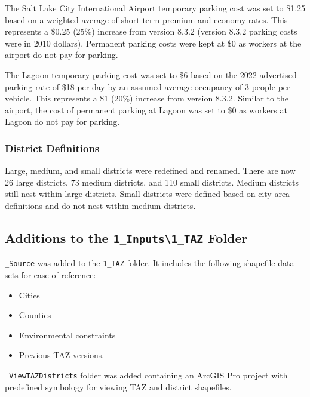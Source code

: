 \documentclass[
  letterpaper,
  DIV=11,
  numbers=noendperiod]{scrreprt}
\providecommand{\tightlist}{%
  \setlength{\itemsep}{0pt}\setlength{\parskip}{0pt}}\usepackage{longtable,booktabs,array}
\begin{document}
The Salt Lake City International Airport temporary parking cost was set
to \$1.25 based on a weighted average of short-term premium and economy
rates. This represents a \$0.25 (25\%) increase from version 8.3.2
(version 8.3.2 parking costs were in 2010 dollars). Permanent parking
costs were kept at \$0 as workers at the airport do not pay for parking.

The Lagoon temporary parking cost was set to \$6 based on the 2022
advertised parking rate of \$18 per day by an assumed average occupancy
of 3 people per vehicle. This represents a \$1 (20\%) increase from
version 8.3.2. Similar to the airport, the cost of permanent parking at
Lagoon was set to \$0 as workers at Lagoon do not pay for parking.

\hypertarget{district-definitions}{%
\subsubsection{District Definitions}\label{district-definitions}}

Large, medium, and small districts were redefined and renamed. There are
now 26 large districts, 73 medium districts, and 110 small districts.
Medium districts still nest within large districts. Small districts were
defined based on city area definitions and do not nest within medium
districts.

\hypertarget{additions-to-the-1_inputs1_taz-folder}{%
\subsection{\texorpdfstring{Additions to the
\texttt{1\_Inputs\textbackslash{}1\_TAZ}
Folder}{Additions to the 1\_Inputs\textbackslash1\_TAZ Folder}}\label{additions-to-the-1_inputs1_taz-folder}}

\texttt{\_Source} was added to the \texttt{1\_TAZ} folder. It includes
the following shapefile data sets for ease of reference:

\begin{itemize}
\tightlist
\item
  Cities
\item
  Counties
\item
  Environmental constraints
\item
  Previous TAZ versions.
\end{itemize}

\texttt{\_ViewTAZDistricts} folder was added containing an ArcGIS Pro
project with predefined symbology for viewing TAZ and district
shapefiles.
\end{document}
